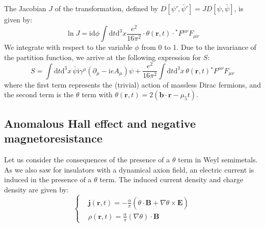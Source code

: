 The Jacobian $J$ of the transformation, defined by $D[\psi', \bar{\psi}'] = J D[\psi, \bar{\psi}]$, is given by:
\begin{equation}
\ln J = \mathrm{i} \mathrm{d}\phi \int \mathrm{d}t \mathrm{d}^3x \frac{e^2}{16\pi^2} \cdot \theta(\bm{r}, t) \cdot {}^*F^{\mu\nu} F_{\mu\nu}
\end{equation}
We integrate with respect to the variable $\phi$ from 0 to 1. Due to the invariance of the partition function, we arrive at the following expression for $S$:
\begin{equation}
S = \int \mathrm{d}t \mathrm{d}^3x \, \bar{\psi} \mathrm{i} \gamma^\mu (\partial_\mu - \mathrm{i} e A_\mu) \psi + \frac{e^2}{16\pi^2} \int \mathrm{d}t \mathrm{d}^3x \, \theta(\bm{r},t) {}^*F^{\mu\nu} F_{\mu\nu}
\end{equation}
where the first term represents the (trivial) action of massless Dirac fermions, and the second term is the $\theta$ term with $\theta(\bm{r},t) = 2(\bm{b} \cdot \bm{r} - \mu_5 t)$.

\subsection{Anomalous Hall effect and negative magnetoresistance}

Let us consider the consequences of the presence of a $\theta$ term in Weyl semimetals. As we also saw for insulators with a dynamical axion field, an electric current is induced in the presence of a $\theta$ term. The induced current density and charge density are given by:
\begin{equation}
\left\{
\begin{aligned}
& \bm{j}(\bm{r}, t) = -\frac{\alpha}{\pi} (\dot{\theta} \cdot \bm{B} + \nabla \theta \times \bm{E}) \\
& \rho(\bm{r}, t) = \frac{\alpha}{\pi} (\nabla \theta) \cdot \bm{B}
\end{aligned}
\right.
\end{equation}
    

